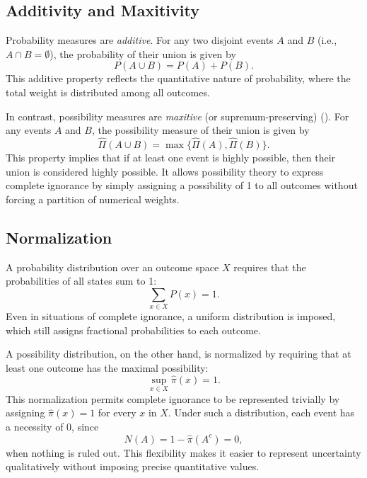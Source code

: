 \documentclass[12pt,a4paper]{report}
\begin{document}
\subsection{Additivity and Maxitivity}
Probability measures are \emph{additive}. For any two disjoint events \(A\) and \(B\) (i.e., \(A\cap B=\emptyset\)), the probability of their union is given by
\[
P(A \cup B) = P(A) + P(B).
\]
This additive property reflects the quantitative nature of probability, where the total weight is distributed among all outcomes.

In contrast, possibility measures are \emph{maxitive} (or supremum-preserving) (\cite{Dubois:2007}). For any events \(A\) and \(B\), the possibility measure of their union is given by
\[
  \hat{\Pi}(A \cup B) = \max\{\hat{\Pi}(A), \hat{\Pi}(B)\}.
\]
This property implies that if at least one event is highly possible, then their union is considered highly possible. It allows possibility theory to express complete ignorance by simply assigning a possibility of 1 to all outcomes without forcing a partition of numerical weights.

\subsection{Normalization}
A probability distribution over an outcome space \(X\) requires that the probabilities of all states sum to 1:
\[
\sum_{x \in X} P(x) = 1.
\]
Even in situations of complete ignorance, a uniform distribution is imposed, which still assigns fractional probabilities to each outcome.

A possibility distribution, on the other hand, is normalized by requiring that at least one outcome has the maximal possibility:
\[
  \sup_{x \in X} \hat{\pi}(x) = 1.
\]
This normalization permits complete ignorance to be represented trivially by assigning \( \hat{\pi}(x)=1 \) for every \(x\) in \(X\). Under such a distribution, each event has a necessity of 0, since
\[
N(A) = 1 - \hat{\pi}(A^c) = 0,
\]
when nothing is ruled out. This flexibility makes it easier to represent uncertainty qualitatively without imposing precise quantitative values.
\end{document}
